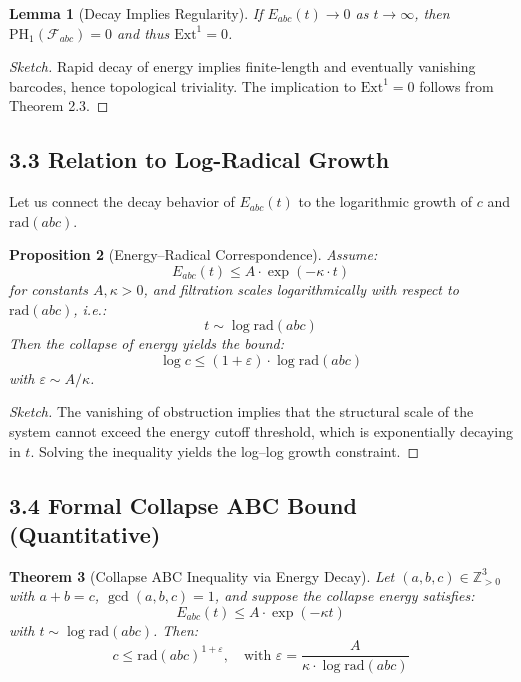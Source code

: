\documentclass[11pt]{article}
\newtheorem{theorem}{Theorem}[section]
\newtheorem{lemma}[theorem]{Lemma}
\newtheorem{proposition}[theorem]{Proposition}
\begin{document}
\begin{lemma}[Decay Implies Regularity]
If \( E_{abc}(t) \to 0 \) as \( t \to \infty \), then \( \mathrm{PH}_1(\mathcal{F}_{abc}) = 0 \) and thus \( \mathrm{Ext}^1 = 0 \).
\end{lemma}

\begin{proof}[Sketch]
Rapid decay of energy implies finite-length and eventually vanishing barcodes, hence topological triviality. The implication to \( \mathrm{Ext}^1 = 0 \) follows from Theorem 2.3.
\end{proof}

\subsection{3.3 Relation to Log-Radical Growth}

Let us connect the decay behavior of \( E_{abc}(t) \) to the logarithmic growth of \( c \) and \( \mathrm{rad}(abc) \).

\begin{proposition}[Energy–Radical Correspondence]
Assume:
\[
E_{abc}(t) \leq A \cdot \exp\left( -\kappa \cdot t \right)
\]
for constants \( A, \kappa > 0 \), and filtration scales logarithmically with respect to \( \mathrm{rad}(abc) \), i.e.:
\[
t \sim \log \mathrm{rad}(abc)
\]
Then the collapse of energy yields the bound:
\[
\log c \leq (1 + \varepsilon) \cdot \log \mathrm{rad}(abc)
\]
with \( \varepsilon \sim A / \kappa \).
\end{proposition}

\begin{proof}[Sketch]
The vanishing of obstruction implies that the structural scale of the system cannot exceed the energy cutoff threshold, which is exponentially decaying in \( t \). Solving the inequality yields the log–log growth constraint.
\end{proof}

\subsection{3.4 Formal Collapse ABC Bound (Quantitative)}

\begin{theorem}[Collapse ABC Inequality via Energy Decay]
Let \( (a, b, c) \in \mathbb{Z}_{>0}^3 \) with \( a + b = c \), \( \gcd(a,b,c) = 1 \), and suppose the collapse energy satisfies:
\[
E_{abc}(t) \leq A \cdot \exp(-\kappa t)
\]
with \( t \sim \log \mathrm{rad}(abc) \). Then:
\[
c \leq \mathrm{rad}(abc)^{1 + \varepsilon}, \quad \text{with } \varepsilon = \frac{A}{\kappa \cdot \log \mathrm{rad}(abc)}
\]
\end{theorem}
\end{document}

